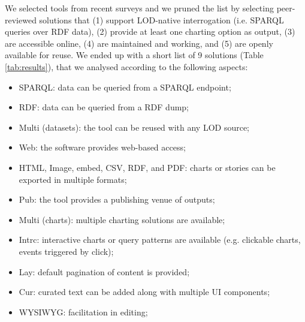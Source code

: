 \documentclass[manuscript]
{acmart}
\begin{document}
We selected tools from recent surveys \cite{desimoni_empirical_2020} and we pruned the list by selecting peer-reviewed solutions that (1) support LOD-native interrogation (i.e. SPARQL queries over RDF data), (2) provide at least one charting option as output, (3) are accessible online, (4) are maintained and working, and (5) are openly available for reuse. We ended up with a short list of 9 solutions (Table \ref{tab:results}), that we analysed according to the following aspects:
\begin{itemize}
    \item SPARQL: data can be queried from a SPARQL endpoint;
    \item RDF: data can be queried from a RDF dump;
    \item Multi (datasets): the tool can be reused with any LOD source;
    \item Web: the software provides web-based access;
    \item HTML, Image, embed, CSV, RDF, and PDF: charts or stories can be exported in multiple formats;
    \item Pub: the tool provides a publishing venue of outputs;
    \item Multi (charts): multiple charting solutions are available;
    \item Intrc: interactive charts or query patterns are available (e.g. clickable charts, events triggered by click);
    \item Lay: default pagination of content is provided;
    \item Cur: curated text can be added along with  multiple UI components;
    \item WYSIWYG: facilitation in editing;
    
\end{itemize}
\end{document}
